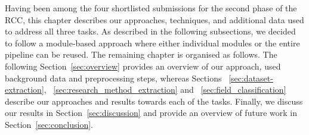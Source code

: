 Having been among the four shortlisted submissions for the second phase of the RCC, this chapter describes our approaches, techniques, and additional data used to address all three tasks. As described in the following subsections, we decided to follow a module-based approach where either individual modules or the entire pipeline can be reused. The remaining chapter is organised as follows. The following Section~\ref{sec:overview} provides an overview of our approach, used background data and preprocessing steps, whereas Sections ~\ref{sec:dataset-extraction}, ~\ref{sec:research_method_extraction} and ~\ref{sec:field_classification} describe our approaches and results towards each of the tasks. Finally, we discuss our results in Section~\ref{sec:discussion} and provide an overview of future work in Section~\ref{sec:conclusion}.












